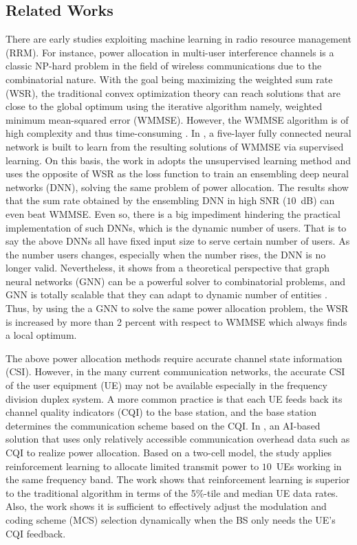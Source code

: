 \documentclass[journal]{IEEEtran}
\begin{document}
	\subsection{Related Works}
	There are early studies exploiting machine learning in radio resource management (RRM). For instance, power allocation in multi-user interference channels is a classic NP-hard problem in the field of wireless communications due to the combinatorial nature. With the goal being maximizing the weighted sum rate (WSR), the traditional convex optimization theory can reach solutions that are close to the global optimum using the iterative algorithm namely, weighted minimum mean-squared error (WMMSE). However, the WMMSE algorithm is of high complexity and thus time-consuming \cite{shi2011iteratively}. In \cite{sun2018learning}, a five-layer fully connected neural network is built to learn from the resulting solutions of WMMSE via supervised learning. On this basis, the work in \cite{liang2018towards} adopts the unsupervised learning method and uses the opposite of WSR as the loss function to train an ensembling deep neural networks (DNN), solving the same problem of power allocation. The results show that the sum rate obtained by the ensembling DNN in high SNR ($10$~dB) can even beat WMMSE. Even so, there is a big impediment hindering the practical implementation of such DNNs, which is the dynamic number of users. That is to say the above DNNs all have fixed input size to serve certain number of users. As the number users changes, especially when the number rises, the DNN is no longer valid. Nevertheless, it shows from a theoretical perspective that graph neural networks (GNN) can be a powerful solver to combinatorial problems, and GNN is totally scalable that they can adapt to dynamic number of entities \cite{sato2019approximation}. Thus, by using the a GNN to solve the same power allocation problem, the WSR is increased by more than 2 percent with respect to WMMSE which always finds a local optimum.
	
	The above power allocation methods require accurate channel state information (CSI). However, in the many current communication networks, the accurate CSI of the user equipment (UE) may not be available especially in the frequency division duplex system. A more common practice is that each UE feeds back its channel quality indicators (CQI) to the base station, and the base station determines the communication scheme based on the CQI. In \cite{ghadimi2017reinforcement}, an AI-based solution that uses only relatively accessible communication overhead data such as CQI to realize power allocation. Based on a two-cell model, the study applies reinforcement learning to allocate limited transmit power to $10$~UEs working in the same frequency band. The work shows that reinforcement learning is superior to the traditional algorithm in terms of the 5\%-tile and median UE data rates. Also, the work \cite{bruno2014robust} shows it is sufficient to effectively adjust the modulation and coding scheme (MCS) selection dynamically when the BS only needs the UE's CQI feedback.
	
\end{document}
